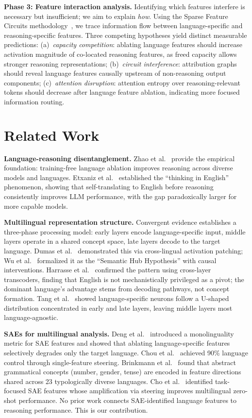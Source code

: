 \documentclass[10pt,twocolumn,a4paper]{article}
\begin{document}
\textbf{Phase 3: Feature interaction analysis.} Identifying which features interfere is necessary but insufficient; we aim to explain \emph{how}. Using the Sparse Feature Circuits methodology~\cite{marks}, we trace information flow between language-specific and reasoning-specific features. Three competing hypotheses yield distinct measurable predictions: (a)~\emph{capacity competition}: ablating language features should increase activation magnitude of co-located reasoning features, as freed capacity allows stronger reasoning representations; (b)~\emph{circuit interference}: attribution graphs should reveal language features causally upstream of non-reasoning output components; (c)~\emph{attention disruption}: attention entropy over reasoning-relevant tokens should decrease after language feature ablation, indicating more focused information routing.

\section{Related Work}

\textbf{Language-reasoning disentanglement.} Zhao et al.~\cite{zhao} provide the empirical foundation: training-free language ablation improves reasoning across diverse models and languages. Etxaniz et al.~\cite{etxaniz} established the ``thinking in English'' phenomenon, showing that self-translating to English before reasoning consistently improves LLM performance, with the gap paradoxically larger for more capable models.

\textbf{Multilingual representation structure.} Convergent evidence establishes a three-phase processing model: early layers encode language-specific input, middle layers operate in a shared concept space, late layers decode to the target language. Dumas et al.~\cite{dumas} demonstrated this via cross-lingual activation patching; Wu et al.~\cite{wu} formalized it as the ``Semantic Hub Hypothesis'' with causal interventions. Harrasse et al.~\cite{harrasse} confirmed the pattern using cross-layer transcoders, finding that English is not mechanistically privileged as a pivot; the dominant language's advantage stems from decoding pathways, not concept formation. Tang et al.~\cite{tang} showed language-specific neurons follow a U-shaped distribution concentrated in early and late layers, leaving middle layers most language-agnostic.

\textbf{SAEs for multilingual analysis.} Deng et al.~\cite{deng} introduced a monolinguality metric for SAE features and showed that ablating language-specific features selectively degrades only the target language. Chou et al.~\cite{chou} achieved 90\% language control through single-feature steering. Brinkmann et al.~\cite{brinkmann} found that abstract grammatical concepts (number, gender, tense) are encoded in feature directions shared across 23 typologically diverse languages. Cho et al.~\cite{cho} identified task-focused SAE features whose amplification via steering improves multilingual zero-shot performance. No prior work connects SAE-identified language features to reasoning performance. This is our contribution.
\end{document}
